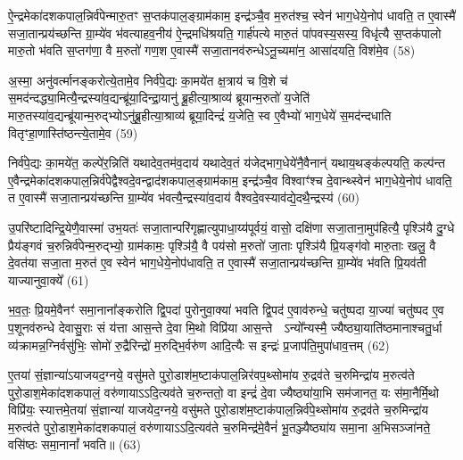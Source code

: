 {\anuvakamend[{रु॒द्रो भे॑ष॒जं वि॒न्दते॒ यदि॑ स्तृणी॒याद॒र्द्धन्द्वाद॑श च।10।}]}

ऐ॒न्द्रमेका॑दशकपाल॒न्निर्व॑पेन्मारु॒तꣳ स॒प्तक॑पाल॒ङ्ग्राम॑काम॒ इन्द्र॑ञ्चै॒व म॒रुत॑श्च॒ स्वेन॑ भाग॒धेये॒नोप॑ धावति॒ त ए॒वास्मै॑ सजा॒तान्प्रय॑च्छन्ति ग्रा॒म्ये॑व भ॑वत्याहव॒नीय॑ ऐ॒न्द्रमधि॑श्रयति॒ गार्\mbox{}ह॑पत्ये मारु॒तं पा॑पवस्य॒सस्य॒ विधृ॑त्यै स॒प्तक॑पालो मारु॒तो भ॑वति स॒प्तग॑णा॒ वै म॒रुतो॑ गण॒श ए॒वास्मै॑ सजा॒तानव॑रुन्धे\-ऽनू॒च्यमा॑न॒ आसा॑दयति॒ विश॑मे॒व (58)

अ॒स्मा॒ अनु॑वर्त्मानङ्करोत्ये॒तामे॒व निर्व॑पे॒द्यः का॒मये॑त क्ष॒त्राय॑ च वि॒शे च॑ स॒मद॑न्दद्ध्या॒मित्यै॒न्द्रस्या॑व॒द्यन्ब्रू॑या॒दिन्द्रा॒यानु॑ ब्रू॒हीत्या॒श्राव्य॑ ब्रूयान्म॒रुतो॑ य॒जेति॑ मारु॒तस्या॑व॒द्यन्ब्रू॑यान्म॒रुद्भ्यो\-ऽनु॑ब्रू॒हीत्या॒श्राव्य॑ ब्रूया॒दिन्द्रं॑ य॒जेति॒ स्व ए॒वैभ्यो॑ भाग॒धेये॑ स॒मद॑न्दधाति वितृꣳहा॒णास्ति॑ष्ठन्त्ये॒तामे॒व (59)

निर्व॑पे॒द्यः का॒मये॑त॒ कल्पे॑र॒न्निति॑ यथादेव॒तम॑व॒दाय॑ यथादेव॒तं य॑जेद्भाग॒धेये॑नै॒वैनान्॑ यथाय॒थङ्क॑ल्पयति॒ कल्प॑न्त ए॒वैन्द्रमेका॑दशकपाल॒न्निर्व॑पेद्वैश्वदे॒वन्द्वाद॑शकपाल॒ङ्ग्राम॑काम॒ इन्द्र॑ञ्चै॒व विश्वाꣳ॑श्च दे॒वान्थ्स्वेन॑ भाग॒धेये॒नोप॑ धावति॒ त ए॒वास्मै॑ सजा॒तान्प्रय॑च्छन्ति ग्रा॒म्ये॑व भ॑वत्यै॒न्द्रस्या॑व॒दाय॑ वैश्वदे॒वस्याव॑द्ये॒दथै॒न्द्रस्य॑ (60)

उ॒परि॑ष्टादिन्द्रि॒येणै॒वास्मा॑ उभ॒यतः॑ सजा॒तान्परि॑गृह्णात्युपाधा॒य्य॑पूर्वयं॒ वासो॒ दक्षि॑णा सजा॒ताना॒मुप॑हित्यै॒ पृश्ञि॑यै दु॒ग्धे प्रैय॑ङ्गवं च॒रुन्निर्व॑पेन्म॒रुद्भ्यो॒ ग्राम॑कामः॒ पृश्ञि॑यै॒ वै पय॑सो म॒रुतो॑ जा॒ताः पृश्ञि॑यै प्रि॒यङ्ग॑वो मारु॒ताः खलु॒ वै दे॒वत॑या सजा॒ता म॒रुत॑ ए॒व स्वेन॑ भाग॒धेये॒नोप॑धावति॒ त ए॒वास्मै॑ सजा॒तान्प्रय॑च्छन्ति ग्रा॒म्ये॑व भ॑वति प्रि॒यव॑ती याज्यानुवा॒क्ये᳚ (61)

भ॒व॒तः॒ प्रि॒यमे॒वैनꣳ॑ समा॒नाना᳚ङ्करोति द्वि॒पदा॑ पुरोनुवा॒क्या॑ भवति द्वि॒पद॑ ए॒वाव॑रुन्धे॒ चतु॑ष्पदा या॒ज्या॑ चतु॑ष्पद ए॒व प॒शूनव॑रुन्धे देवासु॒राः सं य॑त्ता आस॒न्ते दे॒वा मि॒थो विप्रि॑या आस॒न्ते  \-ऽन्यो᳚न्यस्मै॒ ज्यैष्ठ्या॒याति॑ष्ठमानाश्चतु॒र्धा व्य॑क्रामन्न॒ग्निर्वसु॑भिः॒ सोमो॑ रु॒द्रैरिन्द्रो॑ म॒रुद्भि॒र्वरु॑ण आदि॒त्यैः स इन्द्रः॑ प्र॒जाप॑ति॒मुपा॑धाव॒त्तम् (62)

ए॒तया॑ सं॒ज्ञान्या॑\-ऽयाजयद॒ग्नये॒ वसु॑मते पुरो॒डाश॑म॒ष्टाक॑पाल॒न्निर॑वप॒थ्सोमा॑य रु॒द्रव॑ते च॒रुमिन्द्रा॑य म॒रुत्व॑ते पुरो॒डाश॒मेका॑दशकपालं॒ वरु॑णाया\-ऽ\-ऽदि॒त्यव॑ते च॒रुन्ततो॒ वा इन्द्रं॑ दे॒वा ज्यैष्ठ्या॑या॒भि सम॑जानत॒ यः स॑मा॒नैर्मि॒थो विप्रि॑यः॒ स्यात्तमे॒तया॑ सं॒ज्ञान्या॑ याजयेद॒ग्नये॒ वसु॑मते पुरो॒डाश॑म॒ष्टाक॑पाल॒न्निर्व॑पे॒थ्सोमा॑य रु॒द्रव॑ते च॒रुमिन्द्रा॑य म॒रुत्व॑ते पुरो॒डाश॒मेका॑दशकपालं॒ वरु॑णाया\-ऽ\-ऽदि॒त्यव॑ते च॒रुमिन्द्र॑मे॒वैनं॑ भू॒तञ्ज्यैष्ठ्या॑य समा॒ना अ॒भिसञ्जा॑नते॒ वसि॑ष्ठः समा॒नानां᳚ भवति॥ (63)

